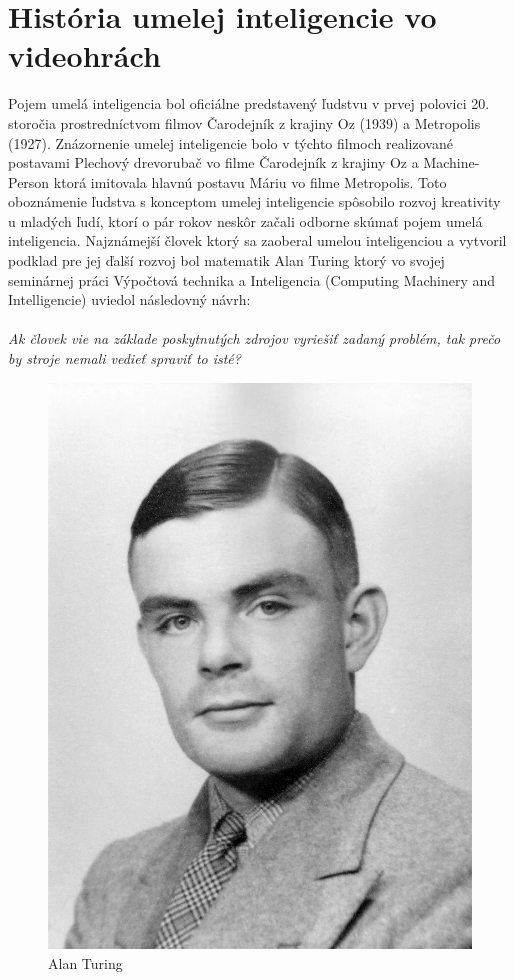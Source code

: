 \documentclass[10pt,oneside,slovak,a4paper]{article}
\begin{document}
\section{História umelej inteligencie vo videohrách} \label{kapitola2}
Pojem umelá inteligencia bol oficiálne predstavený ľudstvu v prvej polovici 20. storočia prostredníctvom filmov Čarodejník z krajiny Oz (1939) a Metropolis (1927). Znázornenie umelej inteligencie bolo v týchto filmoch realizované postavami Plechový drevorubač vo filme Čarodejník z krajiny Oz a Machine-Person ktorá imitovala hlavnú postavu Máriu vo filme Metropolis. Toto oboznámenie ľudstva s konceptom umelej inteligencie spôsobilo rozvoj kreativity u mladých ľudí, ktorí o pár rokov neskôr začali odborne skúmať pojem umelá inteligencia. Najznámejší človek ktorý sa zaoberal umelou inteligenciou a vytvoril podklad pre jej ďalší rozvoj bol matematik Alan Turing ktorý vo svojej seminárnej práci Výpočtová technika a Inteligencia (Computing Machinery and Intelligencie) \cite{CMI} uviedol následovný návrh:
\\\\
\emph{Ak človek vie na základe poskytnutých zdrojov vyriešiť zadaný problém, tak prečo by stroje nemali vedieť spraviť to isté?}
\begin{figure}[tbh]
	\centering
	\includegraphics[scale=0.08]{Alan-Turing.png}
	\caption{Alan Turing}
	\label{obr1}
\end{figure}
\end{document}
